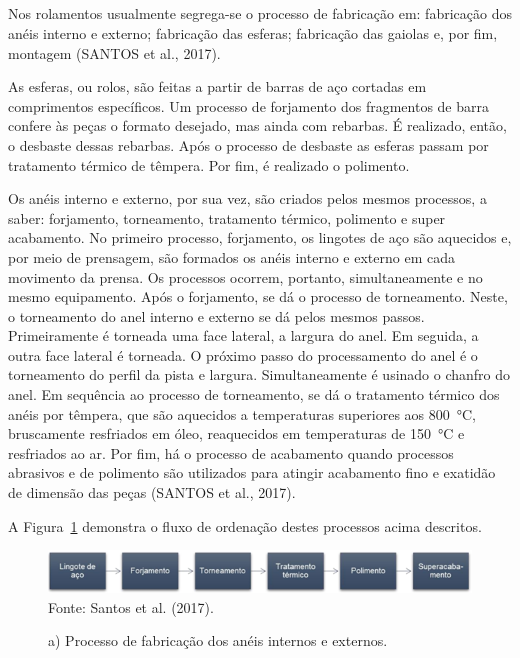 \documentclass[
	12pt,				
	oneside,			
	a4paper,			
	english,			
	brazil,			
	]{abntex2ppgsi}
\begin{document}
\subsection{}

Nos rolamentos usualmente segrega-se o processo de fabricação em: fabricação dos anéis interno e externo; fabricação das esferas; fabricação das gaiolas e, por fim, montagem (SANTOS et al., 2017).   

As esferas, ou rolos, são feitas a partir de barras de aço cortadas em comprimentos específicos. Um processo de forjamento dos fragmentos de barra confere às peças o formato desejado, mas ainda com rebarbas. É realizado, então, o desbaste dessas rebarbas. Após o processo de desbaste as esferas passam por tratamento térmico de têmpera. Por fim, é realizado o polimento. 

Os anéis interno e externo, por sua vez, são criados pelos mesmos processos, a saber: forjamento, torneamento, tratamento térmico, polimento e super acabamento. No primeiro processo, forjamento, os lingotes de aço são aquecidos e, por meio de prensagem, são formados os anéis interno e externo em cada movimento da prensa. Os processos ocorrem, portanto, simultaneamente e no mesmo equipamento. Após o forjamento, se dá o processo de torneamento. Neste, o torneamento do anel interno e externo se dá pelos mesmos passos. Primeiramente é torneada uma face lateral, a largura do anel. Em seguida, a outra face lateral é torneada. O próximo passo do processamento do anel é o torneamento do perfil da pista e largura. Simultaneamente é usinado o chanfro do anel. Em sequência ao processo de torneamento, se dá o tratamento térmico dos anéis por têmpera, que são aquecidos a temperaturas superiores aos \SI{800}{\celsius}, bruscamente resfriados em óleo, reaquecidos em temperaturas de \SI{150}{\celsius} e resfriados ao ar. Por fim, há o processo de acabamento quando processos abrasivos e de polimento são utilizados para atingir acabamento fino e exatidão de dimensão das peças (SANTOS et al., 2017). 


A Figura~\ref{FiguraProcessoFabricacao} demonstra o fluxo de ordenação destes processos acima descritos.
\begin{figure}[!htb]
\centering
\caption{a) Processo de fabricação dos anéis internos e externos.}
\includegraphics[width=\textwidth,height=\textheight,keepaspectratio]{Figura2} \\
Fonte: Santos et al. (2017).
\label{FiguraProcessoFabricacao}
\end{figure}
\end{document}
